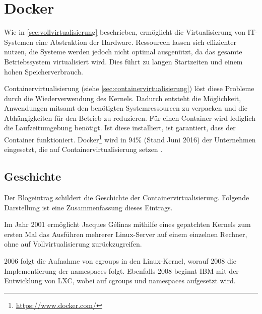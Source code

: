 
\chapter{Docker}
\label{cha:docker}
Wie in \cref{sec:vollvirtualisierung} beschrieben, ermöglicht die Virtualisierung von IT-Systemen eine Abstraktion der Hardware.
Ressourcen lassen sich effizienter nutzen, die Systeme werden jedoch nicht optimal ausgenützt, da das gesamte Betriebssystem virtualisiert wird.
Dies führt zu langen Startzeiten und einem hohen Speicherverbrauch.

Containervirtualisierung (siehe \cref{sec:containervirtualisierung}) löst diese Probleme durch die Wiederverwendung des Kernels.
Dadurch entsteht die Möglichkeit, Anwendungen mitsamt den benötigten Systemressourcen zu verpacken und die Abhängigkeiten für den Betrieb zu reduzieren.
Für einen Container wird lediglich die Laufzeitumgebung benötigt. Ist diese installiert, ist garantiert, dass der Container funktioniert.
Docker\footnote{\url{https://www.docker.com/}} wird in 94\% (Stand Juni 2016) der Unternehmen eingesetzt, die auf Containervirtualisierung setzen \autocite{ContainerAdoption}.

\section{Geschichte}
\label{sec:docker-history}
Der Blogeintrag \autocite{redhat-container-history:online} schildert die Geschichte der Containervirtualisierung. Folgende Darstellung ist eine Zusammenfassung dieses Eintrags.

Im Jahr 2001 ermöglicht Jacques Gélinas mithilfe eines gepatchten Kernels zum ersten Mal das Ausführen mehrerer Linux-Server auf einem einzelnen Rechner, ohne auf Vollvirtualisierung zurückzugreifen.

2006 folgt die Aufnahme von cgroups in den Linux-Kernel, worauf 2008 die Implementierung der namespaces folgt.
Ebenfalls 2008 beginnt IBM mit der Entwicklung von LXC, wobei auf cgroups und namespaces aufgesetzt wird.

